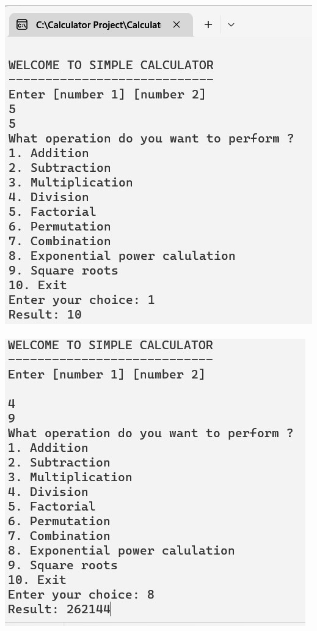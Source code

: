 \documentclass[11pt]{article}
\begin{document}
\includegraphics[scale=0.5]{out1.png}\\ \\
\includegraphics[scale=0.5]{out2.png}\\ \\
\end{document}
